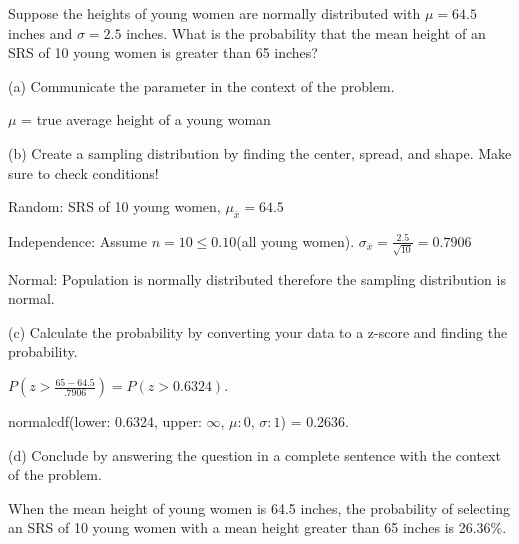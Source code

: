 \documentclass[../stats.tex]{subfiles}
\begin{document}
\begin{example}
    Suppose the heights of young women are normally distributed with $\mu=64.5$ inches and $\sigma=2.5$ inches. What is the probability that the mean height of an SRS of 10 young women is greater than 65 inches?

    (a) Communicate the parameter in the context of the problem.

    $\mu$ = true average height of a young woman 

    (b) Create a sampling distribution by finding the center, spread, and shape. Make sure to check conditions!

    Random: SRS of 10 young women, $\mu_{\overline{x}}=64.5$

    Independence: Assume $n=10\leq 0.10$(all young women). $\sigma_{\overline{x}}=\frac{2.5}{\sqrt{10}}=0.7906$

    Normal: Population is normally distributed therefore the sampling distribution is normal.

    (c) Calculate the probability by converting your data to a z-score and finding the probability.

    $P(z>\frac{65-64.5}{.7906})=P(z>0.6324)$. 

    normalcdf(lower: 0.6324, upper: $\infty$, $\mu:0$, $\sigma:1$) = 0.2636.

    (d) Conclude by answering the question in a complete sentence with the context of the problem.

    When the mean height of young women is 64.5 inches, the probability of selecting an SRS of 10 young women with a mean height greater than 65 inches is 26.36\%.
\end{example}
\end{document}
